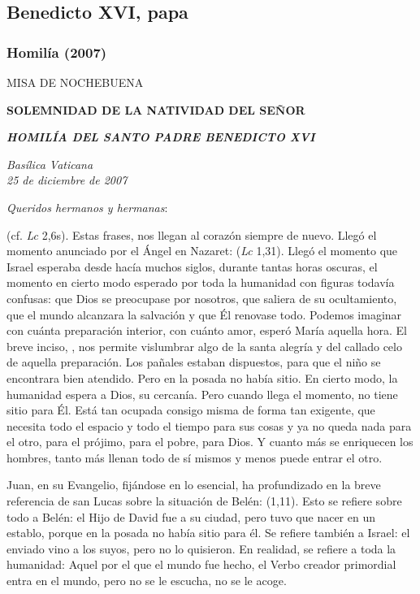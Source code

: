 \begin{body}
\begin{body}
\subsection{Benedicto XVI, papa}

\subsubsection{Homilía (2007)}

MISA DE NOCHEBUENA

\textbf{SOLEMNIDAD DE LA NATIVIDAD DEL SEÑOR}

\textbf{\emph{HOMILÍA DEL SANTO PADRE BENEDICTO XVI}}

\emph{Basílica Vaticana\\ 25 de diciembre de 2007}



\emph{Queridos hermanos y hermanas}:

 (cf. \emph{Lc} 2,6s). Estas frases, nos llegan al corazón siempre de nuevo. Llegó el momento anunciado por el Ángel en Nazaret:  (\emph{Lc} 1,31). Llegó el momento que Israel esperaba desde hacía muchos siglos, durante tantas horas oscuras, el momento en cierto modo esperado por toda la humanidad con figuras todavía confusas: que Dios se preocupase por nosotros, que saliera de su ocultamiento, que el mundo alcanzara la salvación y que Él renovase todo. Podemos imaginar con cuánta preparación interior, con cuánto amor, esperó María aquella hora. El breve inciso, , nos permite vislumbrar algo de la santa alegría y del callado celo de aquella preparación. Los pañales estaban dispuestos, para que el niño se encontrara bien atendido. Pero en la posada no había sitio. En cierto modo, la humanidad espera a Dios, su cercanía. Pero cuando llega el momento, no tiene sitio para Él. Está tan ocupada consigo misma de forma tan exigente, que necesita todo el espacio y todo el tiempo para sus cosas y ya no queda nada para el otro, para el prójimo, para el pobre, para Dios. Y cuanto más se enriquecen los hombres, tanto más llenan todo de sí mismos y menos puede entrar el otro.

Juan, en su Evangelio, fijándose en lo esencial, ha profundizado en la breve referencia de san Lucas sobre la situación de Belén:  (1,11). Esto se refiere sobre todo a Belén: el Hijo de David fue a su ciudad, pero tuvo que nacer en un establo, porque en la posada no había sitio para él. Se refiere también a Israel: el enviado vino a los suyos, pero no lo quisieron. En realidad, se refiere a toda la humanidad: Aquel por el que el mundo fue hecho, el Verbo creador primordial entra en el mundo, pero no se le escucha, no se le acoge.


\end{body}
\end{body}
